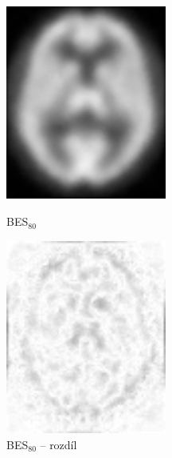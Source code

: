    \begin{figure}[h]
        \begin{minipage}[l]{0.5\textwidth}
            \center
            \includegraphics[width = 150pt]{src/8Appendix/final/10-100besL.png}
            \caption{BES$_{80}$}
        \end{minipage}
        \begin{minipage}[r]{0.5\textwidth}
            \center
            \includegraphics[width = 150pt]{src/8Appendix/final/10-100besLD.png}
            \caption{BES$_{80}$ -- rozdíl}
        \end{minipage}
    \end{figure}